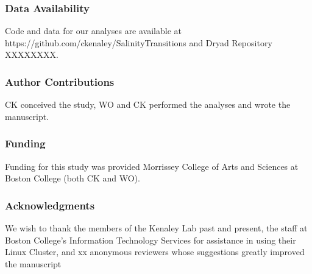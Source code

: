 \documentclass[11pt]{article}
\begin{document}
\subsubsection*{Data Availability}
Code and data for our analyses are available at https://github.com/ckenaley/SalinityTransitions and Dryad Repository XXXXXXXX.

\subsubsection*{Author Contributions}
CK  conceived the study, WO and CK performed the analyses and wrote the manuscript.

\subsubsection*{Funding}
Funding for this study was provided Morrissey College of Arts and Sciences at Boston College (both CK and WO).

\subsubsection*{Acknowledgments}
We wish to thank the members of the Kenaley Lab past and present, the staff at Boston College's Information Technology Services for assistance in using their Linux Cluster, and xx anonymous reviewers whose suggestions greatly improved the manuscript














\end{document}
